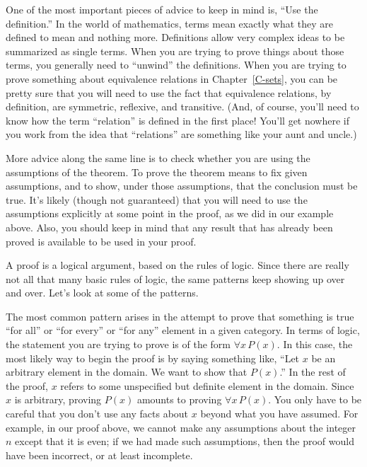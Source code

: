 One of the most important pieces of advice to keep in mind is,
``Use the definition.''  In the world of mathematics, terms
mean exactly what they are defined to mean and nothing more.
Definitions allow very complex ideas to be summarized as
single terms.  When you are trying to prove things about
those terms, you generally need to ``unwind'' the definitions.
When you are trying to prove something about equivalence relations
in Chapter~\ref{C-sets},
you can be pretty sure that you will need to use the
fact that equivalence relations, by definition, are symmetric, reflexive,
and transitive.  (And, of course,
you'll need to know how the term ``relation'' is defined
in the first place!
You'll get nowhere if you work from the idea that ``relations'' are something
like your aunt and uncle.)

More advice along the same line is to check whether you are using the assumptions of the theorem.
To prove the theorem means to fix given assumptions, and to show, under those assumptions, that the conclusion must be true.
It's likely (though not guaranteed) that you will need to use the assumptions explicitly at some point in the proof, as we did in our example above.%
Also, you should keep in mind that any result that has already been proved is available to be used in your proof.

\medbreak

A proof is a logical argument, based on the rules of logic.
Since there are really not all that many basic rules of logic,
the same patterns keep showing up over and over.  Let's look
at some of the patterns.

The most common pattern arises in the attempt to prove that
something is true ``for all'' or ``for every'' or ``for any''
element in a given category.  In terms of logic, the statement
you are trying to prove is of the form $\forall x\,P(x)$.
In this case, the most likely way to begin the proof is
by saying something like, ``Let $x$ be an arbitrary element in 
the domain.  We want to show that $P(x)$.''  In the
rest of the proof, $x$ refers to some unspecified but definite
element in the domain.  Since $x$ is arbitrary,
proving $P(x)$ amounts to proving $\forall x\,P(x)$.  You only
have to be careful that you don't use any facts about $x$ beyond
what you have assumed.  For example, in our proof above, we cannot
make any assumptions about the integer $n$ except that it is
even; if we had made such assumptions, then the proof would have
been incorrect, or at least incomplete.

